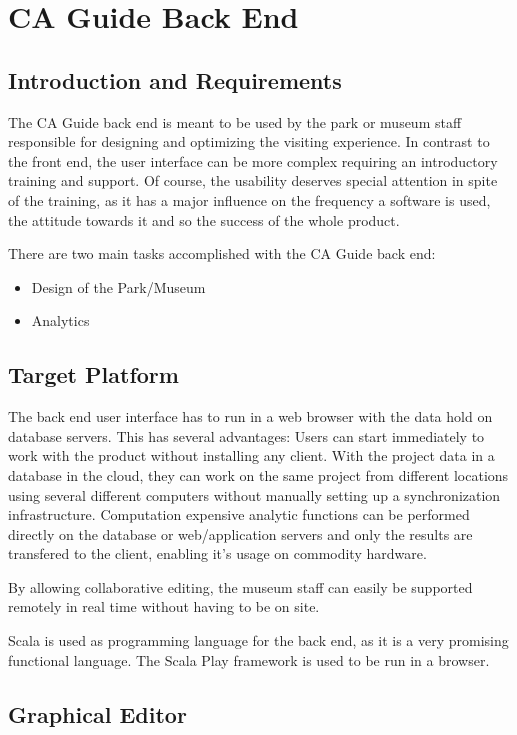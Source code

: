 
\chapter{CA Guide Back End} %

\label{backend} %



\section{Introduction and Requirements}

The CA Guide back end is meant to be used by the park or museum staff responsible for designing and optimizing the visiting experience. In contrast to the front end, the user interface can be more complex requiring an introductory training and support. Of course, the usability deserves special attention in spite of the training, as it has a major influence on the frequency a software is used, the attitude towards it and so the success of the whole product. %

There are two main tasks accomplished with the CA Guide back end:

\begin{itemize}
\item Design of the Park/Museum
\item Analytics
\end{itemize}

\section{Target Platform}

The back end user interface has to run in a web browser with the data hold on database servers. This has several advantages: Users can start immediately to work with the product without installing any client. With the project data in a database  in the cloud, they can work on the same project from different locations using several different computers without manually setting up a synchronization infrastructure. Computation expensive analytic functions can be performed directly on the database or web/application servers and only the results are transfered to the client, enabling it's usage on commodity hardware.

By allowing collaborative editing, the museum staff can easily be supported remotely in real time without having to be on site. 

Scala is used as programming language for the back end, as it is a very promising  functional language. The Scala Play framework is used to be run in a browser.

\section{Graphical Editor}



